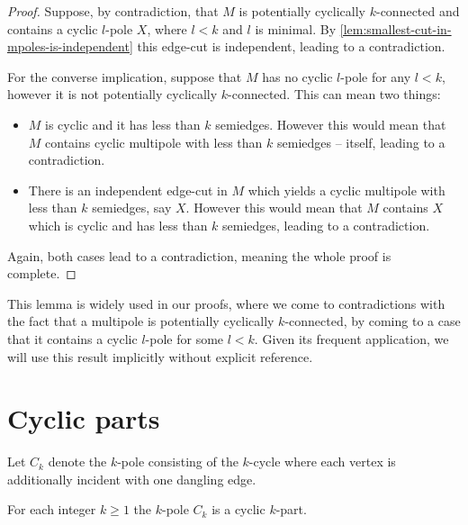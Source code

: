 \documentclass[12pt, twoside]{book}
\begin{document}
\begin{proof}
	Suppose, by contradiction, that $M$ is potentially cyclically $k$-connected and contains a cyclic \mbox{$l$-pole} $X$, where $l<k$ and $l$ is minimal. By \cref{lem:smallest-cut-in-mpoles-is-independent} this edge-cut is independent, leading to a contradiction.
	
	For the converse implication, suppose that $M$ has no cyclic $l$-pole for any $l<k$, however it is not potentially cyclically $k$-connected. This can mean two things:
	\begin{itemize}
		\item $M$ is cyclic and it has less than $k$ semiedges. However this would mean that $M$ contains cyclic multipole with less than $k$ semiedges -- itself, leading to a contradiction.
		\item There is an independent edge-cut in $M$ which yields a cyclic multipole with less than $k$ semiedges, say $X$. However this would mean that $M$ contains $X$ which is cyclic and has less than $k$ semiedges, leading to a contradiction.
	\end{itemize}
	
	Again, both cases lead to a contradiction, meaning the whole proof is complete.
\end{proof}

This lemma is widely used in our proofs, where we come to contradictions with the fact that a multipole is potentially cyclically $k$-connected, by coming to a case that it contains a cyclic $l$-pole for some $l<k$. Given its frequent application, we will use this result implicitly without explicit reference.

\section{Cyclic parts}\label{sec:cyclic-part-results}

Let $C_k$ denote the $k$-pole consisting of the $k$-cycle where each vertex is additionally incident with one dangling edge.

\begin{lemma}\label{lem:each-cycle-cyclic-part}
	For each integer $k\geq 1$ the $k$-pole $C_k$ is a cyclic $k$-part. 
\end{lemma}
\end{document}

